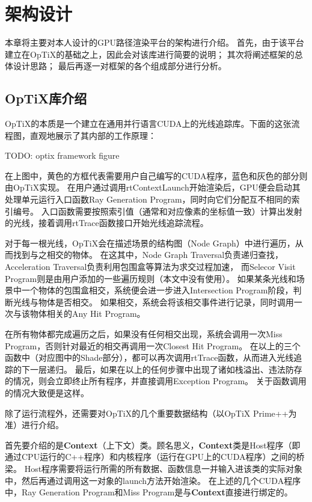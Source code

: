 \chapter{架构设计}
\label{cha:pipeline}

本章将主要对本人设计的GPU路径渲染平台的架构进行介绍。
首先，由于该平台建立在OpTiX的基础之上，因此会对该库进行简要的说明；
其次将阐述框架的总体设计思路；
最后再逐一对框架的各个组成部分进行分析。

\section{OpTiX库介绍}

OpTiX的本质是一个建立在通用并行语言CUDA上的光线追踪库。下面的这张流程图，直观地展示了其内部的工作原理：

TODO: optix framework figure

在上图中，黄色的方框代表需要用户自己编写的CUDA程序，蓝色和灰色的部分则由OpTiX实现。
在用户通过调用rtContextLaunch开始渲染后，GPU便会启动其处理单元运行入口函数Ray Generation Program，同时向它们分配互不相同的索引编号。
入口函数需要按照索引值（通常和对应像素的坐标值一致）计算出发射的光线，接着调用rtTrace函数接口开始光线追踪流程。

对于每一根光线，OpTiX会在描述场景的结构图（Node Graph）中进行遍历，从而找到与之相交的物体。
在这其中，Node Graph Traversal负责递归查找，Acceleration Traversal负责利用包围盒等算法为求交过程加速，
而Selecor Visit Program则是由用户添加的一些遍历规则（本文中没有使用）。
如果某条光线和场景中一个物体的包围盒相交，系统便会进一步进入Intersection Program阶段，判断光线与物体是否相交。
如果相交，系统会将该相交事件进行记录，同时调用一次与该物体相关的Any Hit Program。

在所有物体都完成遍历之后，如果没有任何相交出现，系统会调用一次Miss Program，否则针对最近的相交再调用一次Closest Hit Program。
在以上的三个函数中（对应图中的Shade部分），都可以再次调用rtTrace函数，从而进入光线追踪的下一层递归。
最后，如果在以上的任何步骤中出现了诸如栈溢出、违法防存的情况，则会立即终止所有程序，并直接调用Exception Program。
关于函数调用的情况大致便是这样。

除了运行流程外，还需要对OpTiX的几个重要数据结构（以OpTiX Prime++为准）进行介绍。

首先要介绍的是\textbf{Context}（上下文）类。顾名思义，\textbf{Context}类是Host程序（即通过CPU运行的C++程序）和内核程序（运行在GPU上的CUDA程序）之间的桥梁。
Host程序需要将运行所需的所有数据、函数信息一并输入进该类的实际对象中，然后再通过调用这一对象的launch方法开始渲染。
在上述的几个CUDA程序中，Ray Generation Program和Miss Program是与\textbf{Context}直接进行绑定的。


